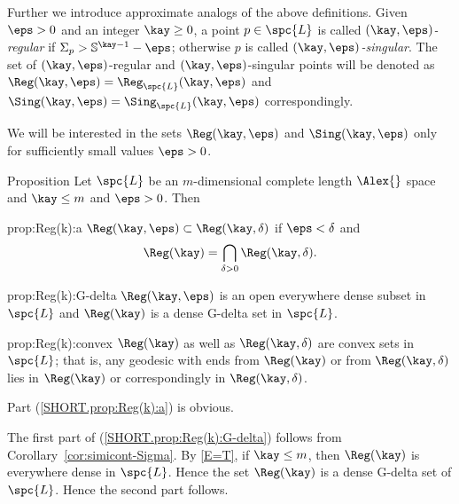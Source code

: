 Further we introduce approximate analogs of the above definitions.
Given $\eps>0$ and an integer $\kay\ge 0$,
a point $p\in\spc{L}$ is called \emph{$(\kay,\eps)$-regular} if
$\Sigma_p>\mathbb{S}^{\kay-1}-\eps$;
otherwise $p$ is called 
\emph{$(\kay,\eps)$-singular}.
The set of $(\kay,\eps)$-regular and $(\kay,\eps)$-singular points will be denoted as $\Reg(\kay,\eps)=\Reg_{\spc{L}}(\kay,\eps)$
and $\Sing(\kay,\eps)=\Sing_{\spc{L}}(\kay,\eps)$ correspondingly.

We will be interested in the sets $\Reg(\kay,\eps)$ and $\Sing(\kay,\eps)$ only for sufficiently small values $\eps>0$.

\begin{thm}{Proposition}\label{prop:Reg(k)}
Let $\spc{L}$ be an $m$-dimensional complete length $\Alex{}$ space and $\kay\le m$ and $\eps>0$.
Then 

\begin{subthm}{prop:Reg(k):a}
$\Reg(\kay,\eps)\subset \Reg(\kay,\delta)$ if $\eps<\delta$
and 
\[\Reg(\kay)=\bigcap_{\delta>0}\Reg(\kay,\delta).\]
\end{subthm}

\begin{subthm}{prop:Reg(k):G-delta}
$\Reg(\kay,\eps)$ is an open everywhere dense subset in $\spc{L}$
and 
$\Reg(\kay)$ is a dense G-delta set in $\spc{L}$.
\end{subthm}

\begin{subthm}{prop:Reg(k):convex}
 $\Reg(\kay)$ as well as $\Reg(\kay,\delta)$ are convex sets in $\spc{L}$;
that is, any geodesic with ends from $\Reg(\kay)$ or from $\Reg(\kay,\delta)$ 
lies in $\Reg(\kay)$ or correspondingly in $\Reg(\kay,\delta)$.
\end{subthm}



\end{thm}

Part (\ref{SHORT.prop:Reg(k):a}) is obvious.

The first part of (\ref{SHORT.prop:Reg(k):G-delta}) follows from Corollary~\ref{cor:simicont-Sigma}.
By \ref{E=T},
if $\kay\le m$, then  $\Reg(\kay)$ is everywhere dense in $\spc{L}$.
Hence the set $\Reg(\kay)$ is a dense G-delta set of $\spc{L}$.
Hence the second part follows.

